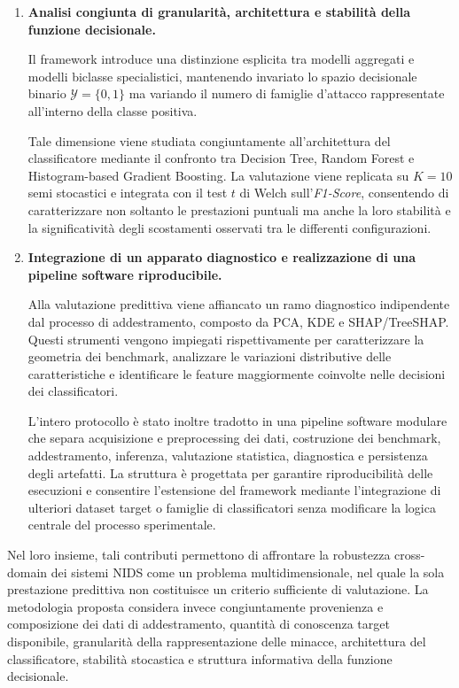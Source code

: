 \begin{enumerate}
    \item \textbf{Analisi congiunta di granularità, architettura e stabilità della funzione decisionale.}
    
    Il framework introduce una distinzione esplicita tra modelli aggregati e modelli biclasse specialistici, mantenendo invariato lo spazio decisionale binario $\mathcal{Y}=\{0,1\}$ ma variando il numero di famiglie d'attacco rappresentate all'interno della classe positiva.
    
    Tale dimensione viene studiata congiuntamente all'architettura del classificatore mediante il confronto tra Decision Tree, Random Forest e Histogram-based Gradient Boosting. 
    La valutazione viene replicata su $K=10$ semi stocastici e integrata con il test $t$ di Welch sull'\textit{F1-Score}, consentendo di caratterizzare non soltanto le prestazioni puntuali ma anche la loro stabilità e la significatività degli scostamenti osservati tra le differenti configurazioni.

    \item \textbf{Integrazione di un apparato diagnostico e realizzazione di una pipeline software riproducibile.}
    
    Alla valutazione predittiva viene affiancato un ramo diagnostico indipendente dal processo di addestramento, composto da PCA, KDE e SHAP/TreeSHAP. 
    Questi strumenti vengono impiegati rispettivamente per caratterizzare la geometria dei benchmark, analizzare le variazioni distributive delle caratteristiche e identificare le feature maggiormente coinvolte nelle decisioni dei classificatori.
    
    L'intero protocollo è stato inoltre tradotto in una pipeline software modulare che separa acquisizione e preprocessing dei dati, costruzione dei benchmark, addestramento, inferenza, valutazione statistica, diagnostica e persistenza degli artefatti. 
    La struttura è progettata per garantire riproducibilità delle esecuzioni e consentire l'estensione del framework mediante l'integrazione di ulteriori dataset target o famiglie di classificatori senza modificare la logica centrale del processo sperimentale.

\end{enumerate}

Nel loro insieme, tali contributi permettono di affrontare la robustezza cross-domain dei sistemi NIDS come un problema multidimensionale, nel quale la sola prestazione predittiva non costituisce un criterio sufficiente di valutazione. 
La metodologia proposta considera invece congiuntamente provenienza e composizione dei dati di addestramento, quantità di conoscenza target disponibile, granularità della rappresentazione delle minacce, architettura del classificatore, stabilità stocastica e struttura informativa della funzione decisionale.

